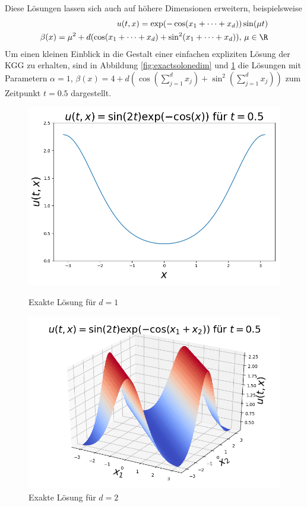 Diese Lösungen lassen sich auch auf höhere Dimensionen erweitern, beispielsweise
\begin{eqnarray}
u(t,x)=\exp(-\cos(x_1+\dots+x_d))\sin(\mu t)\\
\beta(x)=\mu^2+d(\cos(x_1+\dots+x_d)+\sin^2(x_1+\dots+x_d)), \, \mu\in\R \nonumber
\end{eqnarray}
Um einen kleinen Einblick in die Gestalt einer einfachen expliziten Lösung der KGG zu erhalten, sind in Abbildung \ref{fig:exactsolonedim} und \ref{fig:exactsoltwodim} die Lösungen mit Parametern $\alpha=1$, $\beta(x)=4+d(\cos(\sum_{j=1}^dx_j)+\sin^2(\sum_{j=1}^dx_j))$ zum Zeitpunkt $t=0.5$ dargestellt.
\begin{figure}[!htb]
  \includegraphics[width=\linewidth]{Figures/kgg_exact_solution_example1d.png}
  \caption{Exakte Lösung für $d=1$}
  \label{fig:exactsolonedim}
\endminipage
{}
  \includegraphics[width=\linewidth]{Figures/kgg_exact_solution_example2d.png}
  \caption{Exakte Lösung für $d=2$}
  \label{fig:exactsoltwodim}
\endminipage
\captionsetup{labelformat=empty}
\end{figure}

